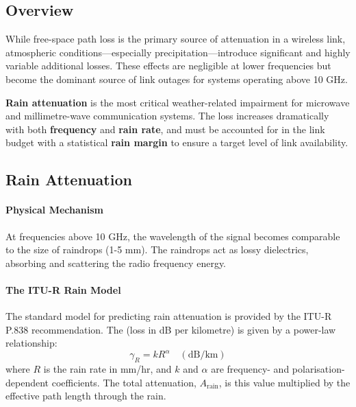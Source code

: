 \subsection{Overview}

While free-space path loss is the primary source of attenuation in a wireless link, atmospheric conditions—especially precipitation—introduce significant and highly variable additional losses. These effects are negligible at lower frequencies but become the dominant source of link outages for systems operating above 10 GHz.

\begin{keyconcept}
    \textbf{Rain attenuation} is the most critical weather-related impairment for microwave and millimetre-wave communication systems. The loss increases dramatically with both \textbf{frequency} and \textbf{rain rate}, and must be accounted for in the link budget with a statistical \textbf{rain margin} to ensure a target level of link availability.
\end{keyconcept}


\subsection{Rain Attenuation}

\paragraph{Physical Mechanism}
At frequencies above 10 GHz, the wavelength of the signal becomes comparable to the size of raindrops (1-5 mm). The raindrops act as lossy dielectrics, absorbing and scattering the radio frequency energy.

\paragraph{The ITU-R Rain Model}
The standard model for predicting rain attenuation is provided by the ITU-R P.838 recommendation. The  (loss in dB per kilometre) is given by a power-law relationship:
\begin{equation}
    \gamma_R = k R^{\alpha} \quad (\text{dB/km})
\end{equation}
where $R$ is the rain rate in mm/hr, and $k$ and $\alpha$ are frequency- and polarisation-dependent coefficients. The total attenuation, $A_{\text{rain}}$, is this value multiplied by the effective path length through the rain.

